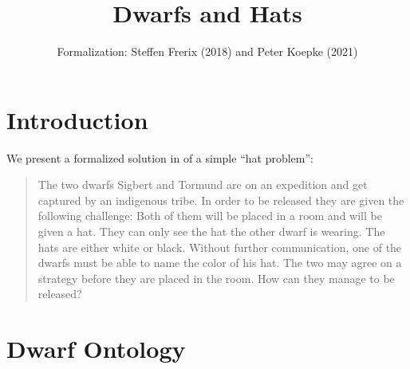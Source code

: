 \documentclass{article}
\title{Dwarfs and Hats}
\author{\Naproche Formalization: Steffen Frerix (2018) and Peter Koepke (2021)}
\date{}
\begin{document}
\maketitle

\section{Introduction}

We present a formalized solution in \Naproche of a simple ``hat problem'':

\begin{quotation}
  \noindent The two dwarfs Sigbert and Tormund are on an expedition and get captured by an indigenous tribe.
  In order to be released they are given the following challenge:
  Both of them will be placed in a room and will be given a hat.
  They can only see the hat the other dwarf is wearing.
  The hats are either white or black.
  Without further communication, one of the dwarfs must be able to name the color of his hat.
  The two may agree on a strategy before they are placed in the room.
  How can they manage to be released?
\end{quotation}


\section{Dwarf Ontology}
\end{document}
